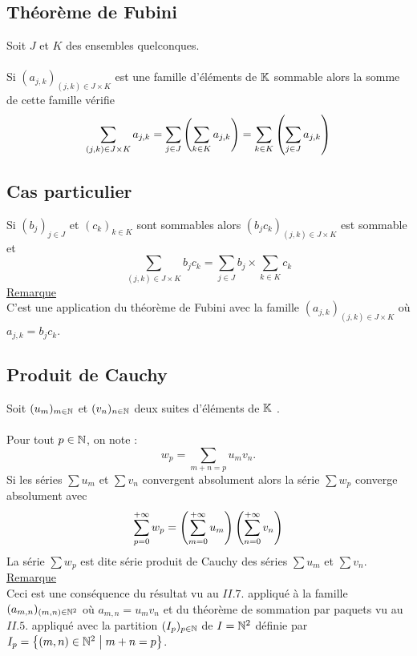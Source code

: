 \subsection{Théorème de Fubini}
\begin{defprop}
    Soit \(J\) et \(K\)   des ensembles quelconques.\\~\\
    Si \((a_{j,k})_{(j,k)\in J\times K}\)  est une famille d’éléments de \(\mathbb{K}\) sommable alors la somme de cette famille vérifie
    \[\sum_{(j,k)\in J\times K}a_{j,k} = \sum_{j\in J}\left(\sum_{k\in K} a_{j,k}\right)= \sum_{k\in K}\left(\sum_{j\in J} a_{j,k}\right)\]
\end{defprop}
\subsection{Cas particulier}
\begin{defprop}
    Si \((b_j)_{j\in J}\) et \((c_k)_{k\in K}\)  sont sommables alors \((b_j c_k)_{(j,k)\in J\times K}\) est sommable et
    \[\sum_{(j,k)\in J\times K}b_j c_k = \sum_{j\in J}b_j \times \sum_{k\in K}c_k\]
    \underline{Remarque}\\
    C’est une application du théorème de Fubini avec la famille \((a_{j,k})_{(j,k)\in J\times K}\)  où \(a_{j,k} = b_j c_k\).
\end{defprop}
\subsection{Produit de Cauchy}
\begin{defprop}
    Soit \((u_m)_{m\in \mathbb{N}}\) et \((v_n)_{n\in \mathbb{N}}\) deux suites d’éléments de \(\mathbb{K}\)  .\\~\\
    Pour tout \(p \in  \mathbb{N}\), on note :
    \[w_p = \sum_{m+n=p}u_mv_n.\]
    Si les séries \(\sum u_m\) et \(\sum v_n\) convergent absolument alors la série \(\sum w_p\) converge absolument avec
    \[\sum^{+\infty}_{p=0}w_p =\left(\sum^{+\infty}_{m=0}u_m\right)\left(\sum^{+\infty}_{n=0}v_n\right)\]
    La série \(\sum w_p\) est dite série produit de Cauchy des séries \(\sum u_m\) et \(\sum v_n\).\\
    \underline{Remarque}\\
    Ceci est une conséquence du résultat vu au \(II. 7.\) appliqué à la famille \((a_{m,n})_{(m,n)\in \mathbb{N}^2}\) où \(a_{m,n} = u_mv_n\) et du théorème de sommation par paquets vu au \(II. 5.\) appliqué avec la partition \((I_p)_{p\in \mathbb{N}}\) de \(I = \mathbb{N}^2\) définie par \(I_p = \left\lbrace(m, n) \in  \mathbb{N}^2\;\middle|\; m + n = p\right\rbrace\).
\end{defprop}